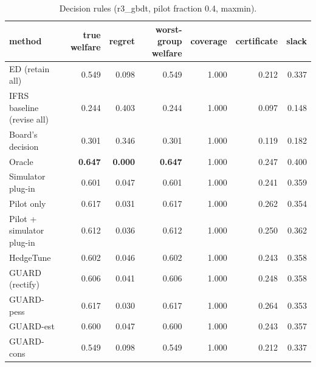 \begin{table}[t]
\centering
\small
\begin{tabular}{lrrrrrr}
\toprule
method & true welfare & regret & worst-group welfare & coverage & certificate & slack \\
\midrule
ED (retain all) & 0.549 & 0.098 & 0.549 & 1.000 & 0.212 & 0.337 \\
IFRS baseline (revise all) & 0.244 & 0.403 & 0.244 & 1.000 & 0.097 & 0.148 \\
Board's decision & 0.301 & 0.346 & 0.301 & 1.000 & 0.119 & 0.182 \\
Oracle & \textbf{0.647} & \textbf{0.000} & \textbf{0.647} & 1.000 & 0.247 & 0.400 \\
Simulator plug-in & 0.601 & 0.047 & 0.601 & 1.000 & 0.241 & 0.359 \\
Pilot only & 0.617 & 0.031 & 0.617 & 1.000 & 0.262 & 0.354 \\
Pilot + simulator plug-in & 0.612 & 0.036 & 0.612 & 1.000 & 0.250 & 0.362 \\
HedgeTune & 0.602 & 0.046 & 0.602 & 1.000 & 0.243 & 0.358 \\
GUARD (rectify) & 0.606 & 0.041 & 0.606 & 1.000 & 0.248 & 0.358 \\
GUARD-pess & 0.617 & 0.030 & 0.617 & 1.000 & 0.264 & 0.353 \\
GUARD-est & 0.600 & 0.047 & 0.600 & 1.000 & 0.243 & 0.357 \\
GUARD-cons & 0.549 & 0.098 & 0.549 & 1.000 & 0.212 & 0.337 \\
\bottomrule
\end{tabular}
\caption{Decision rules (r3\_gbdt, pilot fraction 0.4, maxmin).}
\label{tab:methods-maxmin}
\end{table}
